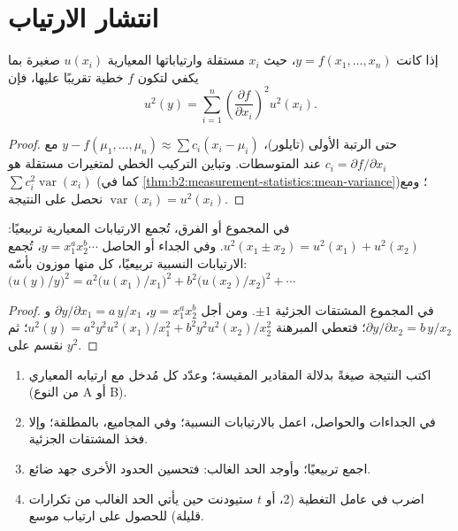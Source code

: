 \section{انتشار الارتياب}

\begin{theorem}\label{thm:b2:measurement-statistics:propagation}
إذا كانت $y = f(x_1, \dots, x_n)$، حيث $x_i$ مستقلة وارتياباتها المعيارية $u(x_i)$ صغيرة
بما يكفي لتكون $f$ خطية تقريبًا عليها، فإن
\begin{equation*}
u^2(y) = \sum_{i=1}^{n}\left(\frac{\partial f}{\partial x_i}\right)^2 u^2(x_i).
\end{equation*}
\end{theorem}

\begin{proof}
حتى الرتبة الأولى (تايلور)، $y - f(\mu_1, \dots, \mu_n) \approx \sum c_i(x_i - \mu_i)$ مع $c_i = \partial
f/\partial x_i$ عند المتوسطات. وتباين التركيب الخطي لمتغيرات مستقلة هو
$\sum c_i^2\operatorname{var}(x_i)$ (كما في \cref{thm:b2:measurement-statistics:mean-variance})؛ ومع
$\operatorname{var}(x_i) = u^2(x_i)$ نحصل على النتيجة.
\end{proof}

\begin{corollary}\label{cor:b2:measurement-statistics:products}
في المجموع أو الفرق، تُجمع الارتيابات المعيارية تربيعيًا: $u^2(x_1 \pm x_2) = u^2(x_1) +
u^2(x_2)$. وفي الجداء أو الحاصل $y = x_1^{a}x_2^{b}\cdots$، تُجمع الارتيابات النسبية
تربيعيًا، كل منها موزون بأسّه: $\bigl(u(y)/y\bigr)^2 = a^2\bigl(u(x_1)/x_1\bigr)^2 +
b^2\bigl(u(x_2)/x_2\bigr)^2 + \cdots$
\end{corollary}

\begin{proof}
في المجموع المشتقات الجزئية $\pm1$. ومن أجل $y = x_1^ax_2^b$، $\partial y/\partial x_1 =
a\,y/x_1$ و$\partial y/\partial x_2 = b\,y/x_2$؛ فتعطي المبرهنة $u^2(y) = a^2y^2u^2(x_1)/x_1^2 +
b^2y^2u^2(x_2)/x_2^2$؛ ثم نقسم على $y^2$.
\end{proof}

\begin{method}\label{met:b2:measurement-statistics:propagate}
\begin{enumerate}
  \item اكتب النتيجة صيغةً بدلالة المقادير المقيسة؛ وعدّد كل مُدخل مع ارتيابه
        المعياري (من النوع A أو B).
  \item في الجداءات والحواصل، اعمل بالارتيابات النسبية؛ وفي المجاميع، بالمطلقة؛
        وإلا فخذ المشتقات الجزئية.
  \item اجمع تربيعيًا؛ وأوجد الحد الغالب: فتحسين الحدود الأخرى جهد ضائع.
  \item اضرب في عامل التغطية (2، أو $t$ ستيودنت حين يأتي الحد الغالب من تكرارات
        قليلة) للحصول على ارتياب موسع.
\end{enumerate}
\end{method}

